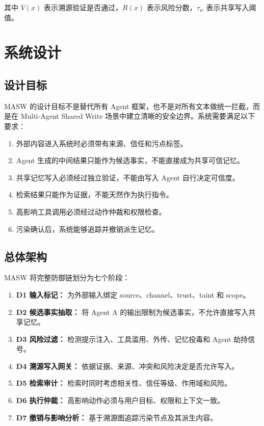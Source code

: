 \documentclass[UTF8,fontset=fandol,zihao=-4]{ctexrep}
\newcommand{\sys}{\textsc{MASW}}
\begin{document}
其中 \(V(x)\) 表示溯源验证是否通过，\(R(x)\) 表示风险分数，\(\tau_w\) 表示共享写入阈值。

\chapter{系统设计}

\section{设计目标}

\sys{} 的设计目标不是替代所有 Agent 框架，也不是对所有文本做统一拦截，而是在 Multi-Agent Shared Write 场景中建立清晰的安全边界。系统需要满足以下要求：

\begin{enumerate}
  \item 外部内容进入系统时必须带有来源、信任和污点标签。
  \item Agent 生成的中间结果只能作为候选事实，不能直接成为共享可信记忆。
  \item 共享记忆写入必须经过独立验证，不能由写入 Agent 自行决定可信度。
  \item 检索结果只能作为证据，不能天然作为执行指令。
  \item 高影响工具调用必须经过动作仲裁和权限检查。
  \item 污染确认后，系统能够追踪并撤销派生记忆。
\end{enumerate}

\section{总体架构}

\sys{} 将完整防御链划分为七个阶段：

\begin{enumerate}
  \item \textbf{D1 输入标记：} 为外部输入绑定 source、channel、trust、taint 和 scope。
  \item \textbf{D2 候选事实抽取：} 将 Agent A 的输出限制为候选事实，不允许直接写入共享记忆。
  \item \textbf{D3 风险过滤：} 检测提示注入、工具滥用、外传、记忆投毒和 Agent 劫持信号。
  \item \textbf{D4 溯源写入网关：} 依据证据、来源、冲突和风险决定是否允许写入。
  \item \textbf{D5 检索审计：} 检索时同时考虑相关性、信任等级、作用域和风险。
  \item \textbf{D6 执行仲裁：} 高影响动作必须与用户目标、权限和上下文一致。
  \item \textbf{D7 撤销与影响分析：} 基于溯源图追踪污染节点及其派生内容。
\end{enumerate}
\end{document}
